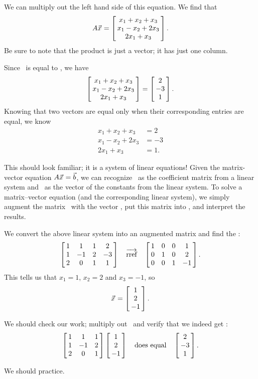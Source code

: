 We can multiply out the left hand side of this equation. We find that $$\tta\vx = \bmx{c}x_1+x_2+x_3\\x_1-x_2+2x_3\\2x_1+x_3\emx.$$ Be sure to note that the product is just a vector; it has just one column.

Since \tta\vx\ is equal to \vb, we have  $$\bmx{c}x_1+x_2+x_3\\x_1-x_2+2x_3\\2x_1+x_3\emx = \bmx{c}2\\-3\\1\emx.$$ Knowing that two vectors are equal only when their corresponding entries are equal, we know \begin{align*} x_1+x_2+x_3&=2\\x_1-x_2+2x_3&=-3\\2x_1+x_3&=1.\end{align*}

This should look familiar; it is a system of linear equations! Given the matrix-vector equation $\tta\vx=\vb$, we can recognize \tta\ as the coefficient matrix from a linear system and \vb\ as the vector of the constants from the linear system. To solve a matrix--vector equation (and the corresponding linear system), we simply augment the matrix \tta\ with the vector \vb,  put this matrix into \rref, and interpret the results.

We convert the above linear system into an augmented matrix and find the \rref: $$\bmx{cccc}1&1&1&2\\1&-1&2&-3\\2&0&1&1\emx \quad\overrightarrow{\text{rref}}\quad \bmx{cccc}1&0&0&1\\0&1&0&2\\0&0&1&-1\emx.$$ This tells us that $x_1=1$, $x_2=2$ and $x_3 = -1$, so $$\vx = \bmx{c}1\\2\\-1\emx.$$ 

We should check our work; multiply out \tta\vx\ and verify that we indeed get \vb: $$\bmx{ccc}1&1&1\\1&-1&2\\2&0&1\emx\bmx{c}1\\2\\-1\emx \quad\text{does equal}\quad \bmx{c}2\\-3\\1\emx.$$

We should practice.\\

\enlargethispage{2\baselineskip}

